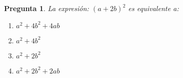 \documentclass{article}
\newtheorem {Pregunta}{Pregunta}
\newenvironment{pregunta}{\begin{Pregunta} \rm}{\rm\end{Pregunta}}
\newenvironment{opciones}{\begin{enumerate}
    \renewcommand{\theenumi}{\Alph{enumi}}}
{\end{enumerate}\renewcommand{\theenumi}{\roman{enumi}}}
\begin{document}
\begin{pregunta}
La expresi\'on:
$(a+2b)^2$ es equivalente a:

\begin{opciones}
\item $a^2+4b^2+4ab$  %
\item $a^2+4b^2$      %
\item $a^2+2b^2$      %
\item $a^2+2b^2 +2ab$ 
\end{opciones}

\end{pregunta}
\end{document}
